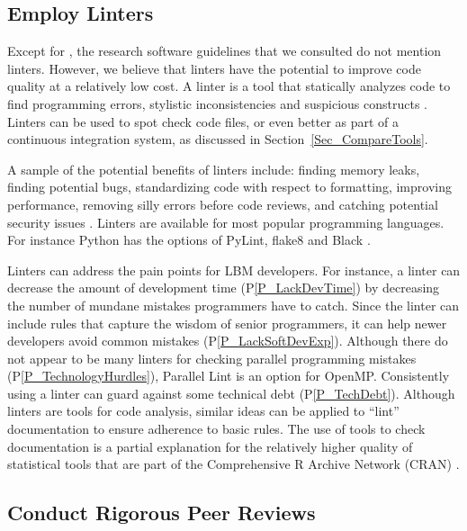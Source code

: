 \documentclass[final, 3p, times, authoryear]{elsarticle}
\newcommand{\ppref}[1]{P\ref{#1}}
\begin{document}
\subsection{Employ Linters} \label{Sec_Linters}

Except for \citet{ThielEtAl2020}, the research software guidelines that we
consulted do not mention linters.  However, we believe that linters have the potential
to improve code quality at a relatively low cost.  A linter is a tool that
statically analyzes code to find programming errors, stylistic inconsistencies
and suspicious constructs \citep{Wikipedia2022_Lint}. Linters can be used to
spot check code files, or even better as part of a continuous integration
system, as discussed in Section~\ref{Sec_CompareTools}.  

A sample of the potential benefits of linters include: finding memory leaks,
finding potential bugs, standardizing code with respect to formatting, improving
performance, removing silly errors before code reviews, and catching potential
security issues \citep{SourceLevel2022_Lint}.  Linters are available for most
popular programming languages.  For instance Python has the options of PyLint,
flake8 and Black \citep{Zadka2018}.

Linters can address the pain points for LBM developers.  For instance, a linter
can decrease the amount of development time (\ppref{P_LackDevTime}) by
decreasing the number of mundane mistakes programmers have to catch.  Since the
linter can include rules that capture the wisdom of senior programmers, it can
help newer developers avoid common mistakes (\ppref{P_LackSoftDevExp}).
Although there do not appear to be many linters for checking parallel
programming mistakes (\ppref{P_TechnologyHurdles}), Parallel Lint is an option
for OpenMP. Consistently using a linter can guard against some technical debt
(\ppref{P_TechDebt}). Although linters are tools for code analysis, similar
ideas can be applied to ``lint'' documentation to ensure adherence to basic
rules.  The use of tools to check documentation is a partial explanation for the
relatively higher quality of statistical tools that are part of the
Comprehensive R Archive Network (CRAN) \citep{SmithEtAl2018_StatSoft}.

\subsection{Conduct Rigorous Peer Reviews} \label{Sec_PeerReview}
\end{document}
